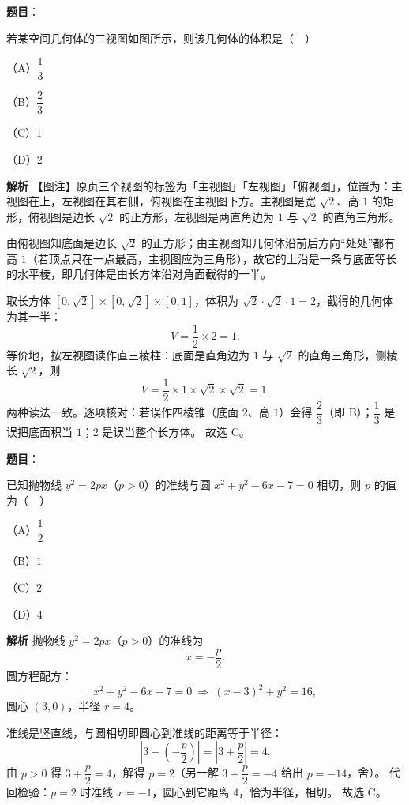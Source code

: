 \begin{answer}

\textbf{题目}：

若某空间几何体的三视图如图所示，则该几何体的体积是（　）

（A）$\dfrac13$

（B）$\dfrac23$

（C）$1$

（D）$2$
\nopagebreak[4]
\begin{center}\end{center}
\nopagebreak[4]
\textbf{解析}
【图注】原页三个视图的标签为「主视图」「左视图」「俯视图」，位置为：主视图在上，左视图在其右侧，俯视图在主视图下方。主视图是宽 $\sqrt2$、高 $1$ 的矩形，俯视图是边长 $\sqrt2$ 的正方形，左视图是两直角边为 $1$ 与 $\sqrt2$ 的直角三角形。

由俯视图知底面是边长 $\sqrt2$ 的正方形；由主视图知几何体沿前后方向“处处”都有高 $1$（若顶点只在一点最高，主视图应为三角形），故它的上沿是一条与底面等长的水平棱，即几何体是由长方体沿对角面截得的一半。

取长方体 $[0,\sqrt2]\times[0,\sqrt2]\times[0,1]$，体积为 $\sqrt2\cdot\sqrt2\cdot 1=2$，截得的几何体为其一半：
\nopagebreak[4]
\[V=\frac12\times 2=1.\]
等价地，按左视图读作直三棱柱：底面是直角边为 $1$ 与 $\sqrt2$ 的直角三角形，侧棱长 $\sqrt2$，则
\nopagebreak[4]
\[V=\frac12\times 1\times\sqrt2\times\sqrt2=1.\]
两种读法一致。逐项核对：若误作四棱锥（底面 $2$、高 $1$）会得 $\dfrac23$（即 B）；$\dfrac13$ 是误把底面积当 $1$；$2$ 是误当整个长方体。
故选 C。


\end{answer}
\begin{answer}

\textbf{题目}：

已知抛物线 $y^2=2px$（$p>0$）的准线与圆 $x^2+y^2-6x-7=0$ 相切，则 $p$ 的值为（　）

（A）$\dfrac12$

（B）$1$

（C）$2$

（D）$4$

\textbf{解析}
抛物线 $y^2=2px$（$p>0$）的准线为
\nopagebreak[4]
\[x=-\frac p2.\]
圆方程配方：
\nopagebreak[4]
\[x^2+y^2-6x-7=0\ \Longrightarrow\ (x-3)^2+y^2=16,\]
圆心 $(3,0)$，半径 $r=4$。

准线是竖直线，与圆相切即圆心到准线的距离等于半径：
\nopagebreak[4]
\[\left|3-\left(-\frac p2\right)\right|=\left|3+\frac p2\right|=4.\]
由 $p>0$ 得 $3+\dfrac p2=4$，解得 $p=2$（另一解 $3+\dfrac p2=-4$ 给出 $p=-14$，舍）。
代回检验：$p=2$ 时准线 $x=-1$，圆心到它距离 $4$，恰为半径，相切。
故选 C。


\end{answer}
